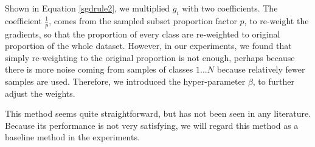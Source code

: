 Shown in Equation \ref{sgdrule2}, we multiplied $g_i$ with two coefficients. The coefficient $\frac{1}{p}$, comes from the sampled subset proportion factor $p$, to re-weight the gradients, so that the proportion of every class are re-weighted to original proportion of the whole dataset. However, in our experiments, we found that simply re-weighting to the original proportion is not enough, perhaps because there is more noise coming from samples of classes $1...N$ because relatively fewer samples are used. Therefore, we introduced the hyper-parameter $\beta$, to further adjust the weights.

This method seems quite straightforward, but has not been seen in any literature. Because its performance is not very satisfying, we will regard this method as a baseline method in the experiments.


